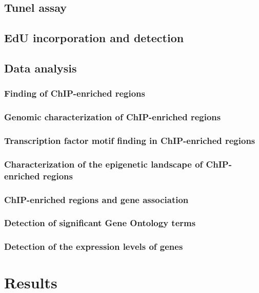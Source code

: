 \documentclass[11pt,twoside,a4paper]{report}
\begin{document}
	\section{Tunel assay}
	\section{EdU incorporation and detection}
		
	\section{Data analysis}
		\subsection{Finding of ChIP-enriched regions}
		\label{subsection:methods_find_ChIP-ER}
		\subsection{Genomic characterization of ChIP-enriched regions}
		\subsection{Transcription factor motif finding in ChIP-enriched regions}
		\subsection{Characterization of the epigenetic landscape of ChIP-enriched regions}
		\subsection{ChIP-enriched regions and gene association}
		\subsection{Detection of significant Gene Ontology terms}
		\subsection{Detection of the expression levels of genes}

\cleardoublepage


\chapter{Results}
\end{document}
